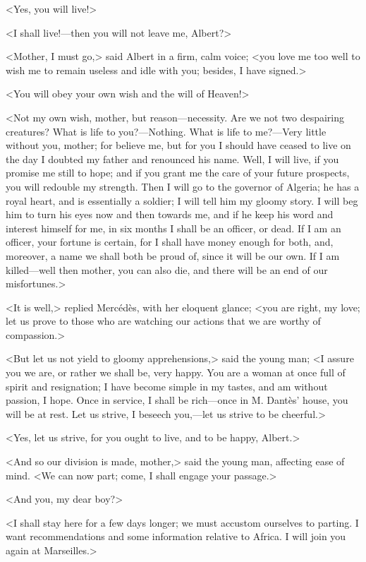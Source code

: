  <Yes, you will live!> 

 <I shall live!—then you will not leave me, Albert?> 

 <Mother, I must go,> said Albert in a firm, calm voice; <you love me too well to wish me to remain useless and idle with you; besides, I have signed.>

<You will obey your own wish and the will of Heaven!> 

 <Not my own wish, mother, but reason—necessity. Are we not two despairing creatures? What is life to you?—Nothing. What is life to me?—Very little without you, mother; for believe me, but for you I should have ceased to live on the day I doubted my father and renounced his name. Well, I will live, if you promise me still to hope; and if you grant me the care of your future prospects, you will redouble my strength. Then I will go to the governor of Algeria; he has a royal heart, and is essentially a soldier; I will tell him my gloomy story. I will beg him to turn his eyes now and then towards me, and if he keep his word and interest himself for me, in six months I shall be an officer, or dead. If I am an officer, your fortune is certain, for I shall have money enough for both, and, moreover, a name we shall both be proud of, since it will be our own. If I am killed—well then mother, you can also die, and there will be an end of our misfortunes.> 

 <It is well,> replied Mercédès, with her eloquent glance; <you are right, my love; let us prove to those who are watching our actions that we are worthy of compassion.> 

 <But let us not yield to gloomy apprehensions,> said the young man; <I assure you we are, or rather we shall be, very happy. You are a woman at once full of spirit and resignation; I have become simple in my tastes, and am without passion, I hope. Once in service, I shall be rich—once in M. Dantès' house, you will be at rest. Let us strive, I beseech you,—let us strive to be cheerful.> 

 <Yes, let us strive, for you ought to live, and to be happy, Albert.> 

 <And so our division is made, mother,> said the young man, affecting ease of mind. <We can now part; come, I shall engage your passage.> 

 <And you, my dear boy?> 

 <I shall stay here for a few days longer; we must accustom ourselves to parting. I want recommendations and some information relative to Africa. I will join you again at Marseilles.> 

